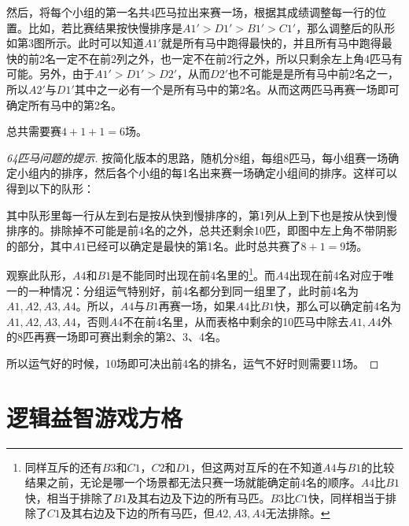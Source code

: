 \begin{example}[赛马简化版]
  然后，将每个小组的第一名共4匹马拉出来赛一场，根据其成绩调整每一行的位置。比如，若比赛结果按快慢排序是$A1'>D1'>B1'>C1'$，那么调整后的队形如第3图所示。此时可以知道$A1'$就是所有马中跑得最快的，并且所有马中跑得最快的前2名一定不在前2列之外，也一定不在前2行之外，所以只剩余左上角4匹马有可能。另外，由于$A1'>D1'>D2'$，从而$D2'$也不可能是是所有马中前2名之一，所以$A2'$与$D1'$其中之一必有一个是所有马中的第2名。从而这两匹马再赛一场即可确定所有马中的第2名。

  总共需要赛$4+1+1=6$场。
\end{example}

\begin{proof}[64匹马问题的提示]
  按简化版本的思路，随机分8组，每组8匹马，每小组赛一场确定小组内的排序，然后各个小组的每1名出来赛一场确定小组间的排序。这样可以得到以下的队形：
  \begin{center}
  \end{center}
  其中队形里每一行从左到右是按从快到慢排序的，第1列从上到下也是按从快到慢排序的。排除掉不可能是前4名的之外，总共还剩余10匹，即图中左上角不带阴影的部分，其中$A1$已经可以确定是最快的第1名。此时总共赛了$8+1=9$场。

  观察此队形，$A4$和$B1$是不能同时出现在前4名里的\footnote{同样互斥的还有$B3$和$C1$，$C2$和$D1$，但这两对互斥的在不知道$A4$与$B1$的比较结果之前，无论是哪一个场景都无法只赛一场就能确定前4名的顺序。$A4$比$B1$快，相当于排除了$B1$及其右边及下边的所有马匹。$B3$比$C1$快，同样相当于排除了$C1$及其右边及下边的所有马匹，但$A2,A3,A4$无法排除。}。而$A4$出现在前4名对应于唯一的一种情况：分组运气特别好，前4名都分到同一组里了，此时前4名为$A1,A2,A3,A4$。所以，$A4$与$B1$再赛一场，如果$A4$比$B1$快，那么可以确定前4名为$A1,A2,A3,A4$，否则$A4$不在前4名里，从而表格中剩余的10匹马中除去$A1,A4$外的8匹再赛一场即可赛出剩余的第2、3、4名。

  所以运气好的时候，10场即可决出前4名的排名，运气不好时则需要11场。
\end{proof}



\section{逻辑益智游戏方格}
\label{sec:logic-puzzle}

